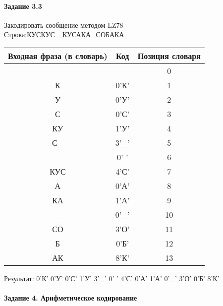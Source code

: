 \documentclass[a4paper, 12pt]{article}
\begin{document}
\pagebreak

\paragraph{Задание 3.3}

Закодировать сообщение методом LZ78\\
Строка:КУСКУС\_ КУСАКА\_СОБАКА\\
\begin{table}[h!]
\centering
\begin{tabular}{|c|c|c|} 
\hline
 Входная фраза (в словарь) & Код & Позиция словаря \\ \hline

 &  & 0 \\ \hline
К & 0'К' & 1 \\ \hline
У & 0'У' & 2 \\ \hline
С & 0'С' & 3 \\ \hline
КУ & 1'У' & 4 \\ \hline
С\_ & 3'\_' & 5 \\ \hline
  & 0' ' & 6 \\ \hline
КУС & 4'С' & 7 \\ \hline
А & 0'А' & 8 \\ \hline
КА & 1'А' & 9 \\ \hline
\_ & 0'\_' & 10 \\ \hline
СО & 3'О' & 11 \\ \hline
Б & 0'Б' & 12 \\ \hline
АК & 8'К' & 13 \\ \hline
\end{tabular}
\end{table}

Результат: 0'К' 0'У' 0'С' 1'У' 3'\_' 0' ' 4'С' 0'А' 1'А' 0'\_' 3'О' 0'Б' 8'К'\\
\pagebreak
\paragraph{Задание 4. Арифметическое кодирование\\}
\end{document}
